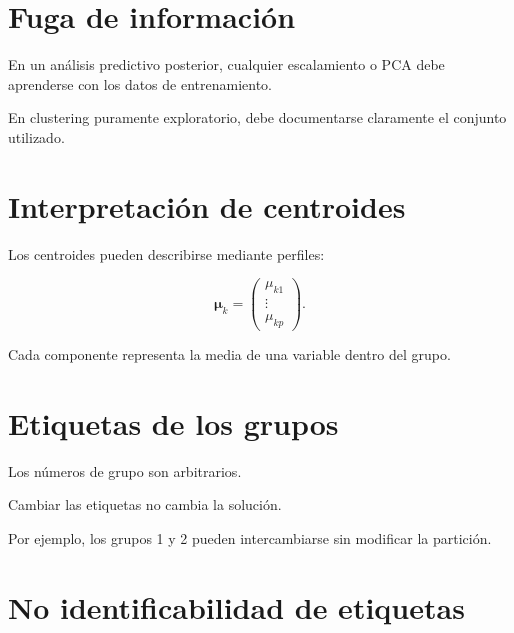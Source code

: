 \documentclass[
  spanish,
  10.5pt,
  letterpaper,
  DIV=11,
  numbers=noendperiod,
  oneside,
  open=any]{scrreprt}
\theoremstyle{definition}
\theoremstyle{definition}
\theoremstyle{plain}
\theoremstyle{remark}
\begin{document}
\section*{Fuga de información}\label{fuga-de-informaciuxf3n-2}


En un análisis predictivo posterior, cualquier escalamiento o PCA debe
aprenderse con los datos de entrenamiento.

En clustering puramente exploratorio, debe documentarse claramente el
conjunto utilizado.

\section*{Interpretación de
centroides}\label{interpretaciuxf3n-de-centroides}


Los centroides pueden describirse mediante perfiles:

\[
\boldsymbol{\mu}_k
=
\begin{pmatrix}
\mu_{k1}\\
\vdots\\
\mu_{kp}
\end{pmatrix}.
\]

Cada componente representa la media de una variable dentro del grupo.

\section*{Etiquetas de los grupos}\label{etiquetas-de-los-grupos}


Los números de grupo son arbitrarios.

Cambiar las etiquetas no cambia la solución.

Por ejemplo, los grupos 1 y 2 pueden intercambiarse sin modificar la
partición.

\section*{No identificabilidad de
etiquetas}\label{no-identificabilidad-de-etiquetas}
\end{document}
